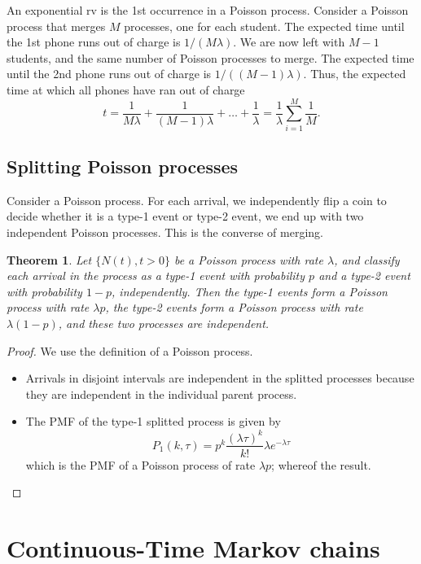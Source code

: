 \documentclass[12pt,a4paper]{article}
\newtheorem{theorem}{Theorem}
\begin{document}
An exponential rv is the 1st occurrence in a Poisson process. Consider a Poisson process that merges $M$ processes, one for each student. 
The expected time until the 1st phone runs out of charge is $1/(M\lambda)$. 
We are now left with $M-1$ students, and the same number of Poisson processes to merge. 
The expected time until the 2nd phone runs out of charge is $1/((M-1)\lambda)$.
Thus, the expected time at which all phones have ran out of charge
$$
t = \frac{1}{M\lambda}+\frac{1}{(M-1)\lambda}+\ldots+\frac{1}{\lambda}
= \frac{1}{\lambda}\sum_{i=1}^M\frac 1 M.
$$ 
\subsection{Splitting Poisson processes}
Consider a Poisson process.
For each arrival, we independently flip a coin to decide whether it is a type-1 event or type-2 event, we end up with two independent Poisson processes. 
This is the converse of merging.
\begin{theorem}
	Let $\{N (t), t > 0\}$ be a Poisson process with rate
	$\lambda$, and classify each arrival in the process as a type-1 event with probability $p$ and a type-2 event with probability $1 - p$, independently. 
	Then the type-1 events form a Poisson process with rate $\lambda p$, the type-2 events form a Poisson process with rate
	$\lambda (1-p)$, and these two processes are independent.
	\end{theorem}
	
\begin{proof}
	We use the definition of a Poisson process. 
	\begin{itemize}
			\item Arrivals in disjoint intervals are independent in the splitted processes because
		they are independent in the individual parent process.
		\item The PMF of the type-1 splitted process  is given by
		\begin{equation}
			P_1(k,\tau) = p^k  \frac{(\lambda \tau)^{k}}{k!}\lambda e^{-\lambda \tau}
		\end{equation}
		which is the PMF of a Poisson process of rate $\lambda p$; whereof the result.
		\end{itemize}
	
\end{proof}


\newpage
\section{Continuous-Time Markov chains}
\end{document}
